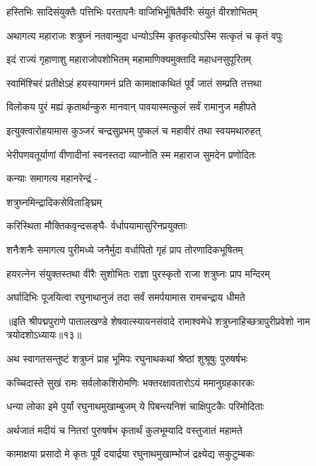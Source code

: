 \twolineshloka
{हस्तिभिः सादिसंयुक्तैः पत्तिभिः परतापनैः}
{वाजिभिर्भूषितैर्वीरैः संयुतं वीरशोभितम्}%

\twolineshloka
{अथागत्य महाराजः शत्रुघ्नं नतवान्मुदा}
{धन्योऽस्मि कृतकृत्योऽस्मि सत्कृतं च कृतं वपुः}%

\twolineshloka
{इदं राज्यं गृहाणाशु महाराजोपशोभितम्}
{महामाणिक्यमुक्तादि महाधनसुपूरितम्}%

\twolineshloka
{स्वामिंश्चिरं प्रतीक्षेऽहं हयस्यागमनं प्रति}
{कामाक्षाकथितं पूर्वं जातं सम्प्रति तत्तथा}%

\twolineshloka
{विलोकय पुरं मह्यं कृतार्थान्कुरु मानवान्}
{पावयास्मत्कुलं सर्वं रामानुज महीपते}%

\twolineshloka
{इत्युक्त्वारोहयामास कुञ्जरं चन्द्रसुप्रभम्}
{पुष्कलं च महावीरं तथा स्वयमथारुहत्}%

\twolineshloka
{भेरीपणवतूर्याणां वीणादीनां स्वनस्तदा}
{व्याप्नोति स्म महाराज सुमदेन प्रणोदितः}%

कन्याः समागत्य महानरेन्द्रं -

शत्रुघ्नमिन्द्रादिकसेविताङ्घ्रिम्

\twolineshloka
{करिस्थिता मौक्तिकवृन्दसङ्घै-}
{र्वर्धापयामासुरिनप्रयुक्ताः}%

\twolineshloka
{शनैःशनैः समागत्य पुरीमध्ये जनैर्मुदा}
{वर्धापितो गृहं प्राप तोरणादिकभूषितम्}%

\twolineshloka
{हयरत्नेन संयुक्तस्तथा वीरैः सुशोभितः}
{राज्ञा पुरस्कृतो राजा शत्रुघ्नः प्राप मन्दिरम्}%

\twolineshloka
{अर्घादिभिः पूजयित्वा रघुनाथानुजं तदा}
{सर्वं समर्पयामास रामचन्द्राय धीमते}%

॥इति श्रीपद्मपुराणे पातालखण्डे शेषवात्स्यायनसंवादे रामाश्वमेधे शत्रुघ्नाहिच्छत्रापुरीप्रवेशो नाम त्रयोदशोऽध्यायः॥१३॥



\twolineshloka
{अथ स्वागतसन्तुष्टं शत्रुघ्नं प्राह भूमिपः}
{रघुनाथकथां श्रेष्ठां शुश्रूषुः पुरुषर्षभः}%


\twolineshloka
{कच्चिदास्ते सुखं रामः सर्वलोकशिरोमणिः}
{भक्तरक्षावतारोऽयं ममानुग्रहकारकः}%

\twolineshloka
{धन्या लोका इमे पुर्यां रघुनाथमुखाम्बुजम्}
{ये पिबन्त्यनिशं चाक्षिपुटकैः परिमोदिताः}%

\twolineshloka
{अर्थजातं मदीयं च नितरां पुरुषर्षभ}
{कृतार्थं कुलभूम्यादि वस्तुजातं महामते}%

\twolineshloka
{कामाक्षया प्रसादो मे कृतः पूर्वं दयार्द्रया}
{रघुनाथमुखाम्भोजं द्रक्ष्येद्य सकुटुम्बकः}%

